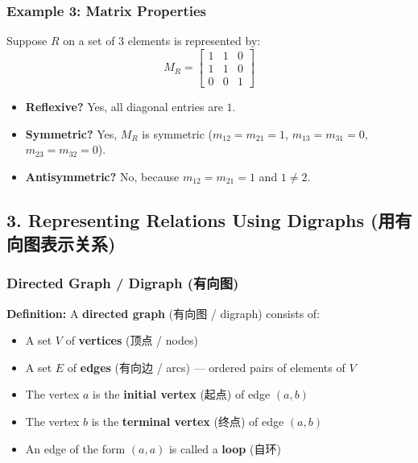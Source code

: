 \documentclass[10pt,a4paper,openany]{ctexbook}
\theoremstyle{definition}
\theoremstyle{remark}
\begin{document}
\subsubsection{Example 3: Matrix Properties}

Suppose $R$ on a set of 3 elements is represented by:
\[
M_R = \begin{bmatrix}
1 & 1 & 0 \\
1 & 1 & 0 \\
0 & 0 & 1
\end{bmatrix}
\]

\begin{itemize}
\item \textbf{Reflexive?} Yes, all diagonal entries are $1$.
\item \textbf{Symmetric?} Yes, $M_R$ is symmetric ($m_{12}=m_{21}=1$, $m_{13}=m_{31}=0$, $m_{23}=m_{32}=0$).
\item \textbf{Antisymmetric?} No, because $m_{12}=m_{21}=1$ and $1 \neq 2$.

\end{itemize}

\vspace{-2pt}

\subsection{3. Representing Relations Using Digraphs (用有向图表示关系)}

\subsubsection{Directed Graph / Digraph (有向图)}

\textbf{Definition:} A \textbf{directed graph} (有向图 / digraph) consists of:
\begin{itemize}
\item A set $V$ of \textbf{vertices} (顶点 / nodes)
\item A set $E$ of \textbf{edges} (有向边 / arcs) — ordered pairs of elements of $V$

\item The vertex $a$ is the \textbf{initial vertex} (起点) of edge $(a,b)$
\item The vertex $b$ is the \textbf{terminal vertex} (终点) of edge $(a,b)$
\item An edge of the form $(a,a)$ is called a \textbf{loop} (自环)

\end{itemize}
\end{document}
